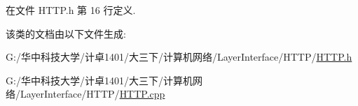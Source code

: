 在文件 H\+T\+T\+P.\+h 第 16 行定义.



该类的文档由以下文件生成\+:\begin{DoxyCompactItemize}
\item 
G\+:/华中科技大学/计卓1401/大三下/计算机网络/\+Layer\+Interface/\+H\+T\+T\+P/\hyperlink{_h_t_t_p_8h}{H\+T\+T\+P.\+h}\item 
G\+:/华中科技大学/计卓1401/大三下/计算机网络/\+Layer\+Interface/\+H\+T\+T\+P/\hyperlink{_h_t_t_p_8cpp}{H\+T\+T\+P.\+cpp}\end{DoxyCompactItemize}

